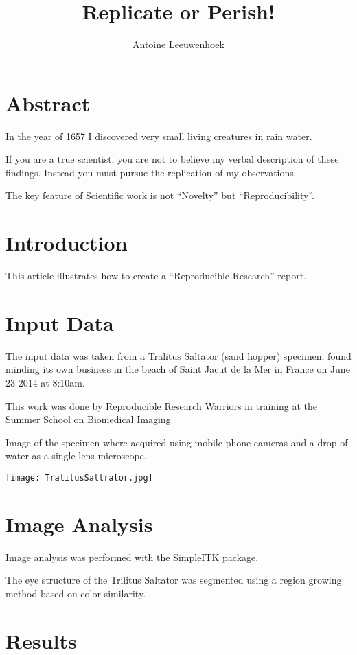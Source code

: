 \documentclass{article}
\title{Replicate or Perish!}
\author{Antoine Leeuwenhoek}
\begin{document}
\maketitle

\section{Abstract}

In the year of 1657 I discovered very small living creatures in rain water.

If you are a true scientist, you are not to believe my verbal description of these
findings. Instead you must pursue the replication of my observations.

The key feature of Scientific work is not ``Novelty'' but ``Reproducibility''.

\section{Introduction}

This article illustrates how to create a ``Reproducible Research'' report.

\section{Input Data}

The input data was taken from a Tralitus Saltator (sand hopper) specimen, found
minding its own business in the beach of Saint Jacut de la Mer in France on
June 23 2014 at 8:10am.

This work was done by Reproducible Research Warriors in training at the Summer
School on Biomedical Imaging.

Image of the specimen where acquired using mobile phone cameras and a drop of
water as a single-lens microscope.

\texttt{[image: TralitusSaltrator.jpg]}

\section{Image Analysis}

Image analysis was performed with the SimpleITK package.

The eye structure of the Trilitus Saltator was segmented using a region growing
method based on color similarity.

\section{Results}
\end{document}
